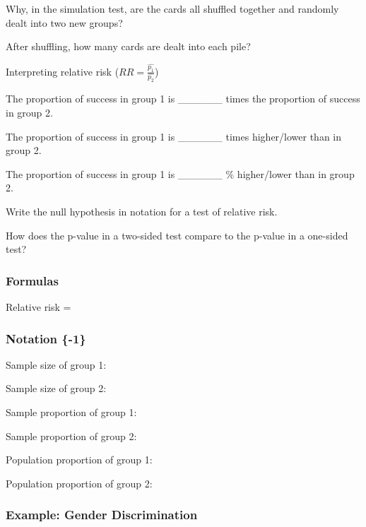\documentclass[
]{report}
\newcommand{\rgs}{\vspace{12pt}} %
\newcommand{\rgi}{\hspace{24pt}}  %
\begin{document}
Why, in the simulation test, are the cards all shuffled together and randomly dealt into two new groups?
\rgs

After shuffling, how many cards are dealt into each pile?
\rgs

Interpreting relative risk (\(RR = \frac{\hat{p_1}}{\hat{p_2}}\))

\rgi The proportion of success in group 1 is \_\_\_\_\_\_ times the proportion of success in group 2.

\rgi The proportion of success in group 1 is \_\_\_\_\_\_ times higher/lower than in group 2.

\rgi The proportion of success in group 1 is \_\_\_\_\_\_ \% higher/lower than in group 2.

Write the null hypothesis in notation for a test of relative risk.
\rgs

How does the p-value in a two-sided test compare to the p-value in a one-sided test?
\rgs

\hypertarget{formulas-5}{%
\subsubsection*{Formulas}\label{formulas-5}}

Relative risk =
\rgs

\hypertarget{notation--1}{%
\subsubsection{Notation \{-1\}}\label{notation--1}}

Sample size of group 1:
\rgs

Sample size of group 2:
\rgs

Sample proportion of group 1:
\rgs

Sample proportion of group 2:
\rgs

Population proportion of group 1:
\rgs

Population proportion of group 2:
\rgs

\hypertarget{example-gender-discrimination}{%
\subsubsection*{Example: Gender Discrimination}\label{example-gender-discrimination}}
\end{document}
